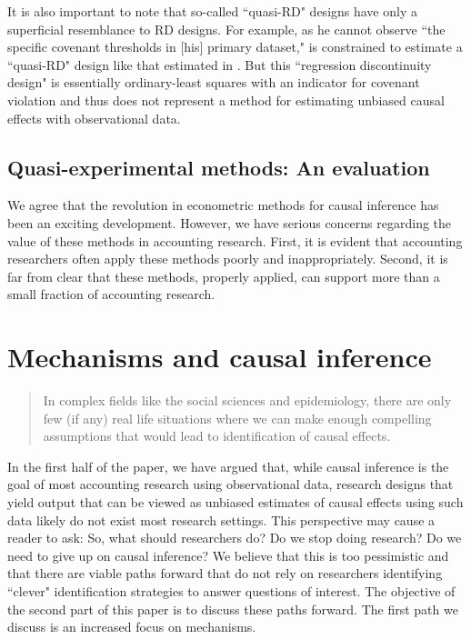 \documentclass[11pt,reqno,titlepage]{amsart}
\begin{document}
\begin{doublespace}
It is also important to note that so-called ``quasi-RD" designs have only a superficial resemblance to RD designs.
For example, as he cannot observe ``the specific covenant thresholds in [his] primary dataset," \citet{Tan:2013ce} is constrained to estimate a ``quasi-RD" design like that estimated in \citet{Roberts:2009ka}.
But this ``regression discontinuity design" is essentially ordinary-least squares with an indicator for covenant violation and thus does not represent a method for estimating unbiased causal effects with observational data.


\subsection{Quasi-experimental methods: An evaluation}
We agree that the revolution in econometric methods for causal inference has been an exciting development.
However, we have serious concerns regarding the value of these methods in accounting research. 
First, it is evident that accounting researchers often apply these methods poorly and inappropriately.
Second, it is far from clear that these methods, properly applied, can support more than a small fraction of accounting research.

\section{Mechanisms and causal inference} \label{sec:mech}

\begin{quotation}
In complex fields like the social sciences and epidemiology, there are only few (if any) real life situations where we can make enough compelling assumptions that would lead to identification of causal effects.
\end{quotation}

In the first half of the paper, we have argued that, while causal inference is the goal of most accounting research using observational data, research designs that yield output that can be viewed as unbiased estimates of causal effects using such data likely do not exist most research settings.
This perspective may cause a reader to ask: 
So, what should researchers do? Do we stop doing research? Do we need to give up on causal inference? 
We believe that this is too pessimistic and that there are viable paths forward that do not rely on researchers identifying ``clever" identification strategies to answer questions of interest.
The objective of the second part of this paper is to discuss these paths forward.
The first path we discuss is an increased focus on mechanisms.


\end{doublespace}
\end{document}
